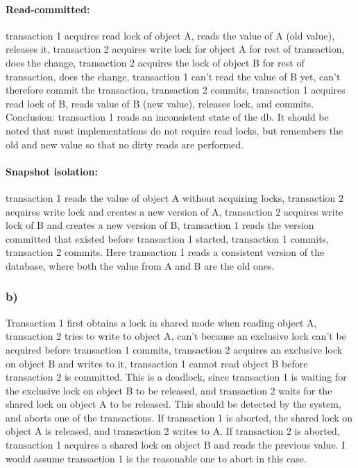 \documentclass[12pt, titlepage]{report}
\begin{document}
\paragraph{Read-committed:} transaction 1 acquires read lock of object A, reads the value of A (old value), releases it, transaction 2 acquires write lock for object A for rest of transaction, does the change, transaction 2 acquires the lock of object B for rest of transaction, does the change, transaction 1 can't read the value of B yet, can't therefore commit the transaction, transaction 2 commits, transaction 1 acquires read lock of B, reads value of B (new value), releases lock, and commits. Conclusion: transaction 1 reads an inconsistent state of the db. It should be noted that most implementations do not require read locks, but remembers the old and new value so that no dirty reads are performed.

\paragraph{Snapshot isolation:} transaction 1 reads the value of object A without acquiring locks, transaction 2 acquires write lock and creates a new version of A, transaction 2 acquires write lock of B and creates a new version of B, transaction 1 reads the version committed that existed before transaction 1 started, transaction 1 commits, transaction 2 commits. Here transaction 1 reads a consistent version of the database, where both the value from A and B are the old ones.
\subsubsection{b)}
Transaction 1 first obtains a lock in shared mode when reading object A, transaction 2 tries to write to object A, can't because an exclusive lock can't be acquired before transaction 1 commits, transaction 2 acquires an exclusive lock on object B and writes to it, transaction 1 cannot read object B before transaction 2 is committed. This is a deadlock, since transaction 1 is waiting for the exclusive lock on object B to be released, and transaction 2 waits for the shared lock on object A to be released. This should be detected by the system, and aborts one of the transactions. If transaction 1 is aborted, the shared lock on object A is released, and transaction 2 writes to A. If transaction 2 is aborted, transaction 1 acquires a shared lock on object B and reads the previous value. I would assume transaction 1 is the reasonable one to abort in this case.
\end{document}
